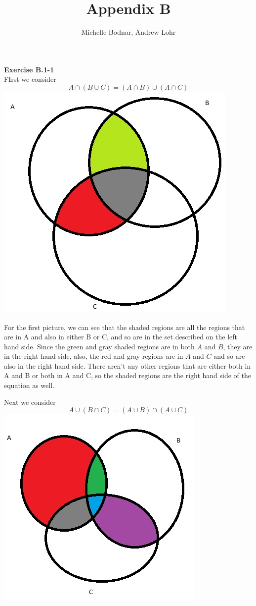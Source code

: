 \documentclass{article}
\title{Appendix B}
\author{Michelle Bodnar, Andrew Lohr}
\begin{document}
\maketitle
\noindent\textbf{Exercise B.1-1}\\
FIrst we consider
\[
A\cap(B\cup C) = (A\cap B)\cup (A \cap C)
\]
\includegraphics{B(1)}

For the first picture, we can see that the shaded regions are all the regions that are in A and also in either B or C, and so are in the set described on the left hand side. Since the green and gray shaded regions are in both $A$ and $B$, they are in the right hand side, also, the red and gray regions are in $A$ and $C$ and so are also in the right hand side. There aren't any other regions that are either both in A and B or both in A and C, so the shaded regions are the right hand side of the equation as well.


Next we consider
\[
A\cup(B\cap C) = (A\cup B) \cap (A\cup C)
\]
\includegraphics{B(2)}
\end{document}
